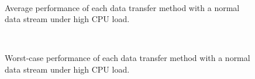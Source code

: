 \begin{figure}[!t]
 \begin{center}
  \\
  \caption{Average performance of each data transfer method with a
  normal data stream under high CPU load.}
  \label{fig:average_normal_cpuload}
 \end{center}
\end{figure}
\begin{figure}
 \begin{center}
  \\
  \caption{Worst-case performance of each data transfer method with a
  normal data stream under high CPU load.}
  \label{fig:worst_normal_cpuload}
 \end{center}
\end{figure}


